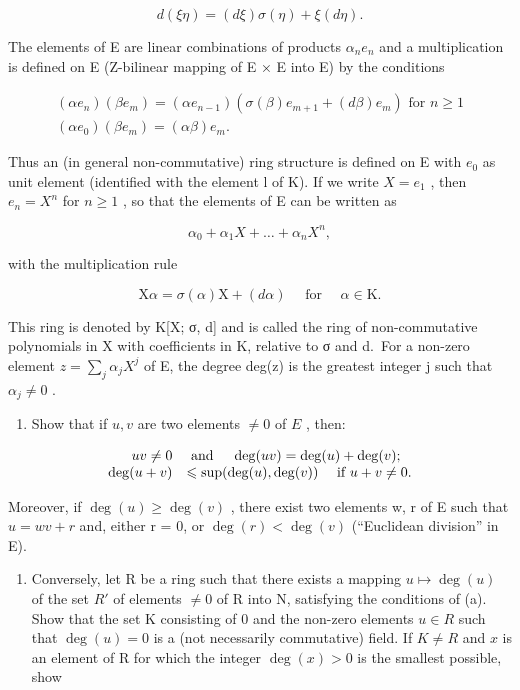 \[
d (\xi \eta) = (d \xi) \sigma (\eta) + \xi (d \eta).
\]

The elements of E are linear combinations of products \(\alpha_{n}e_{n}\) and a multiplication is defined on E (Z-bilinear mapping of E × E into E) by the conditions

\[
\begin{array}{l} (\alpha e _ {n}) (\beta e _ {m}) = (\alpha e _ {n - 1}) (\sigma (\beta) e _ {m + 1} + (d \beta) e _ {m}) \text { for } n \geqslant 1 \\ (\alpha e _ {0}) (\beta e _ {m}) = (\alpha \beta) e _ {m}. \end{array}
\]

Thus an (in general non-commutative) ring structure is defined on E with \(e_{0}\) as unit element (identified with the element l of K). If we write \(X = e_{1}\) , then \(e_{n} = X^{n}\) for \(n \geqslant 1\) , so that the elements of E can be written as

\[
\alpha_ {0} + \alpha_ {1} X + \dots + \alpha_ {n} X ^ {n},
\]

with the multiplication rule

\[
\mathrm{X} \alpha = \sigma (\alpha) \mathrm{X} + (d \alpha) \quad \text { for } \quad \alpha \in \mathrm{K}.
\]

This ring is denoted by K{[}X; σ, d{]} and is called the ring of non-commutative polynomials in X with coefficients in K, relative to σ and d.~For a non-zero element \(z = \sum_{j} \alpha_{j} X^{j}\) of E, the degree deg(z) is the greatest integer j such that \(\alpha_{j} \neq 0\) .

\begin{enumerate}
\def\labelenumi{(\alph{enumi})}
\tightlist
\item
  Show that if \(u, v\) are two elements \(\neq 0\) of \(E\) , then:
\end{enumerate}

\[
\begin{array}{r l} u v \neq 0 & \text { and } \quad \deg (u v) = \deg (u) + \deg (v); \\ \deg (u + v) & \leqslant \sup (\deg (u), \deg (v)) \quad \text { if } u + v \neq 0. \end{array}
\]

Moreover, if \(\deg(u) \geqslant \deg(v)\) , there exist two elements w, r of E such that \(u = wv + r\) and, either r = 0, or \(\deg(r) < \deg(v)\) (``Euclidean division'' in E).

\begin{enumerate}
\def\labelenumi{(\alph{enumi})}
\setcounter{enumi}{1}
\tightlist
\item
  Conversely, let R be a ring such that there exists a mapping \(u \mapsto \deg(u)\) of the set \(R'\) of elements \(\neq 0\) of R into N, satisfying the conditions of (a). Show that the set K consisting of 0 and the non-zero elements \(u \in R\) such that \(\deg(u) = 0\) is a (not necessarily commutative) field. If \(K \neq R\) and \(x\) is an element of R for which the integer \(\deg(x) > 0\) is the smallest possible, show
\end{enumerate}

